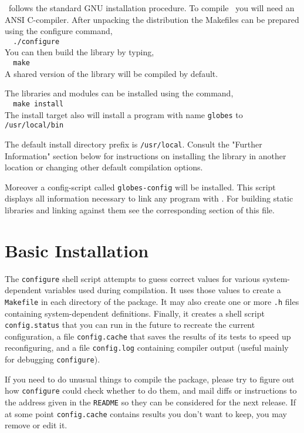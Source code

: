 \begin{appendix}
\GLOBES\ follows the standard GNU installation procedure.  To compile
\GLOBES\ you will need an ANSI C-compiler.  After unpacking the
distribution the Makefiles can be prepared using the configure
command,\\
\verb+  ./configure+\\
You can then build the library by typing,\\
\verb+  make+\\
A shared  version of the library will be compiled by
default. 
 
The libraries and modules can be installed using the command,\\
\verb+  make install+\\
The install target also will install a program with name \verb+globes+
 to \verb+/usr/local/bin+

The default install directory prefix is \verb+/usr/local+.  Consult the
"Further Information" section below for instructions on installing the
library in another location or changing other default compilation
options.

Moreover a config-script called \verb+globes-config+ will be
installed. This script displays all information necessary to link any
program with \GLOBES.  For building static libraries and linking against
them see the corresponding section of this file.
 
                    

\section*{Basic Installation}



   The \verb+configure+ shell script attempts to guess correct values for
various system-dependent variables used during compilation.  It
uses those values to create a \verb+Makefile+ in each directory of the
package.  It may also create one or more \verb+.h+ files containing
system-dependent definitions.  Finally, it creates a shell script
\verb+config.status+ that you can run in the future to recreate the
current configuration, a file \verb+config.cache+ that saves the results
of its tests to speed up reconfiguring, and a file \verb+config.log+
containing compiler output (useful mainly for debugging
\verb+configure+).

   If you need to do unusual things to compile the package, please try
to figure out how \verb+configure+ could check whether to do them, and mail
diffs or instructions to the address given in the \verb+README+ so they can
be considered for the next release.  If at some point \verb+config.cache+
contains results you don't want to keep, you may remove or edit it.


\end{appendix}

